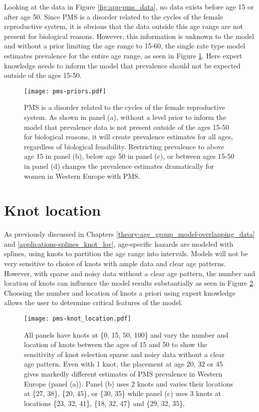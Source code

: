 Looking at the data in Figure \ref{fig:app-pms_data}, no data exists before age 15 or after age 50.  Since PMS is a disorder related to the cycles of the female reproductive system, it is obvious that the data outside this age range are not present for biological reasons.  However, this information is unknown to the model and without a prior limiting the age range to 15-60, the single rate type model estimates prevalence for the entire age range, as seen in Figure \ref{fig:app-prios_on_level}.  Here expert knowledge needs to inform the model that prevalence should not be expected outside of the ages 15-50.

    \begin{figure}
        \begin{center}
            \texttt{[image: pms-priors.pdf]}
        \end{center}
        \caption{PMS is a disorder related to the cycles of the female reproductive system.  As shown in panel (a), without a level prior to inform the model that prevalence data is not present outside of the ages 15-50 for biological reasons, it will create prevalence estimates for all ages, regardless of biological feasibility.  Restricting prevalence to above age 15 in panel (b), below age 50 in panel (c), or between ages 15-50 in panel (d) changes the prevalence estimates dramatically for women in Western Europe with PMS.}
        \label{fig:app-prios_on_level}
    \end{figure}

\section{Knot location}
As previously discussed in Chapters \ref{theory-age_group_model-overlapping_data} and \ref{applications-splines_knot_loc}, age-specific hazards are modeled with splines, using knots to partition the age range into intervals.  Models will not be very sensitive to choice of knots with ample data and clear age patterns.  However, with sparse and noisy data without a clear age pattern, the number and location of knots can influence the model results substantially as seen in Figure \ref{fig:app-knot_loc}.  Choosing the number and location of knots a priori using expert knowledge allows the user to determine critical features of the model.

    \begin{figure}
        \begin{center}
            \texttt{[image: pms-knot\_location.pdf]}
        \end{center}
        \caption{All panels have knots at \{0, 15, 50, 100\} and vary the number and location of knots between the ages of 15 and 50 to show the sensitivity of knot selection sparse and noisy data without a clear age pattern. Even with 1 knot, the placement at age 20, 32 or 45 gives markedly different estimates of PMS prevalence in Western Europe (panel (a)).  Panel (b) uses 2 knots and varies their locations at \{27, 38\}, \{20, 45\}, or \{30, 35\} while panel (c) uses 3 knots at locations \{23, 32, 41\}, \{18, 32, 47\} and \{29, 32, 35\}.}
        \label{fig:app-knot_loc}
    \end{figure}


